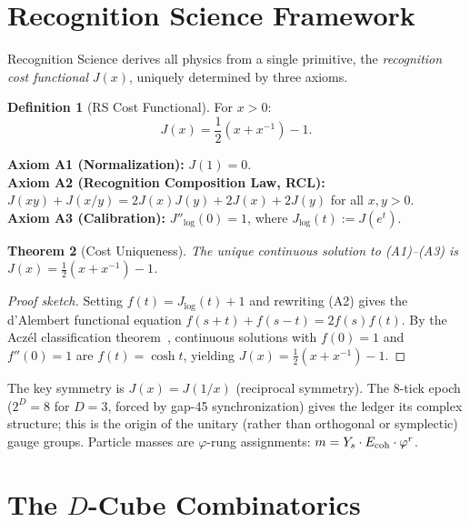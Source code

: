 \documentclass[12pt,a4paper]{article}
\newtheorem{theorem}{Theorem}[section]
\theoremstyle{definition}
\newtheorem{definition}[theorem]{Definition}
\theoremstyle{remark}
\begin{document}
\section{Recognition Science Framework}
\label{sec:framework}

Recognition Science derives all physics from a single primitive,
the \emph{recognition cost functional} $J(x)$, uniquely determined
by three axioms.

\begin{definition}[RS Cost Functional]
For $x > 0$:
\begin{equation}
  J(x) = \frac{1}{2}\!\left(x + x^{-1}\right) - 1.
\end{equation}
\end{definition}

\noindent\textbf{Axiom A1 (Normalization):} $J(1) = 0$.\\
\textbf{Axiom A2 (Recognition Composition Law, RCL):}
$J(xy) + J(x/y) = 2J(x)J(y) + 2J(x) + 2J(y)$ for all $x, y > 0$.\\
\textbf{Axiom A3 (Calibration):} $J''_{\log}(0) = 1$, where
$J_{\log}(t) := J(e^t)$.

\begin{theorem}[Cost Uniqueness]
\label{thm:unique}
The unique continuous solution to \textup{(A1)--(A3)} is
$J(x) = \tfrac{1}{2}(x + x^{-1}) - 1$.
\end{theorem}

\begin{proof}[Proof sketch]
Setting $f(t) = J_{\log}(t) + 1$ and rewriting \textup{(A2)} gives
the d'Alembert functional equation $f(s+t) + f(s-t) = 2f(s)f(t)$.
By the Acz\'el classification theorem~\cite{Aczel1966}, continuous
solutions with $f(0) = 1$ and $f''(0) = 1$ are $f(t) = \cosh t$,
yielding $J(x) = \tfrac{1}{2}(x + x^{-1}) - 1$.
\end{proof}

\noindent The key symmetry is $J(x) = J(1/x)$ (reciprocal symmetry).
The 8-tick epoch ($2^D = 8$ for $D = 3$, forced by gap-45 synchronization)
gives the ledger its complex structure; this is the origin of the unitary
(rather than orthogonal or symplectic) gauge groups.  Particle masses are
$\varphi$-rung assignments: $m = Y_s \cdot E_{\rm coh} \cdot \varphi^r$.

\section{The $D$-Cube Combinatorics}
\label{sec:cube}
\end{document}
